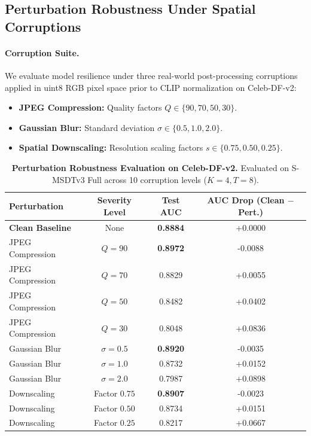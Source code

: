 \subsection{Perturbation Robustness Under Spatial Corruptions}
\label{sec:robustness_audit}
\paragraph{Corruption Suite.}
We evaluate model resilience under three real-world post-processing corruptions applied in uint8 RGB pixel space prior to CLIP normalization on Celeb-DF-v2:
\begin{itemize}[leftmargin=*]
    \item \textbf{JPEG Compression:} Quality factors $Q \in \{90, 70, 50, 30\}$.
    \item \textbf{Gaussian Blur:} Standard deviation $\sigma \in \{0.5, 1.0, 2.0\}$.
    \item \textbf{Spatial Downscaling:} Resolution scaling factors $s \in \{0.75, 0.50, 0.25\}$.
\end{itemize}

\begin{table}[t]
\centering
\small
\caption{\textbf{Perturbation Robustness Evaluation on Celeb-DF-v2.} Evaluated on S-MSDTv3 Full across 10 corruption levels ($K=4, T=8$).}
\label{tab:robustness}
\begin{tabular}{l c c c}
\toprule
\textbf{Perturbation} & \textbf{Severity Level} & \textbf{Test AUC} & \textbf{AUC Drop (Clean $-$ Pert.)} \\
\midrule
\textbf{Clean Baseline} & None & \textbf{0.8884} & +0.0000 \\
\midrule
JPEG Compression & $Q = 90$ & \textbf{0.8972} & -0.0088 \\
JPEG Compression & $Q = 70$ & 0.8829 & +0.0055 \\
JPEG Compression & $Q = 50$ & 0.8482 & +0.0402 \\
JPEG Compression & $Q = 30$ & 0.8048 & +0.0836 \\
\midrule
Gaussian Blur & $\sigma = 0.5$ & \textbf{0.8920} & -0.0035 \\
Gaussian Blur & $\sigma = 1.0$ & 0.8732 & +0.0152 \\
Gaussian Blur & $\sigma = 2.0$ & 0.7987 & +0.0898 \\
\midrule
Downscaling & Factor $0.75$ & \textbf{0.8907} & -0.0023 \\
Downscaling & Factor $0.50$ & 0.8734 & +0.0151 \\
Downscaling & Factor $0.25$ & 0.8217 & +0.0667 \\
\bottomrule
\end{tabular}
\end{table}

